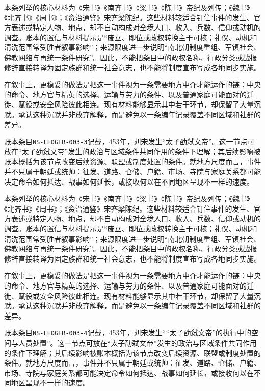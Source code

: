 本条列举的核心材料为《宋书》《南齐书》《梁书》《陈书》帝纪及列传；《魏书》《北齐书》《周书》；《资治通鉴》宋齐梁陈纪。这些材料较适合钉住事件的发生、官方表述或特定人物、地点，却不自动构成对全境人口、收入、兵数、信仰或动机的调查。账本的置信与材料提示是“废立、即位或政权转换主干可核；礼仪、动机和清洗范围常受胜者叙事影响”；来源限度进一步说明“南北朝制度重组、军镇社会、佛教网络与再统一条件研究”。因此，不能把条目中的政权名称、行政分类或战报修辞直接转译为固定族群和统一社会意志，也不能将制度宣布写成各地同步实施。

在叙事上，更稳妥的做法是把这一事件视为一条需要地方中介才能运作的链：中央的命令、地方官与精英的选择、运输与劳力的条件、以及普通家庭可能面对的迁徙、赋役或安全风险彼此相连。现有材料能够显示其中若干环节，却保留了大量沉默。承认这种沉默并非放弃解释，而是避免以一条编年记录覆盖不同区域和社群的差异。

账本条目\texttt{NS-LEDGER-003-3}记载，453年，刘宋发生“太子劭弑文帝”。这一节点可放在“太子劭弑文帝”发生的政治与区域条件共同作用的条件下理解；其后续影响被账本概括为该节点改变后续资源、联盟或制度处置的条件。就地方尺度而言，事件并不只属于朝廷或统帅：征发、道路、仓储、户籍、市场、寺院与家庭关系都可能决定命令如何抵达、战事如何延长，或接收何以在不同地区呈现不一样的速度。

本条列举的核心材料为《宋书》《南齐书》《梁书》《陈书》帝纪及列传；《魏书》《北齐书》《周书》；《资治通鉴》宋齐梁陈纪。这些材料较适合钉住事件的发生、官方表述或特定人物、地点，却不自动构成对全境人口、收入、兵数、信仰或动机的调查。账本的置信与材料提示是“废立、即位或政权转换主干可核；礼仪、动机和清洗范围常受胜者叙事影响”；来源限度进一步说明“南北朝制度重组、军镇社会、佛教网络与再统一条件研究”。因此，不能把条目中的政权名称、行政分类或战报修辞直接转译为固定族群和统一社会意志，也不能将制度宣布写成各地同步实施。

在叙事上，更稳妥的做法是把这一事件视为一条需要地方中介才能运作的链：中央的命令、地方官与精英的选择、运输与劳力的条件、以及普通家庭可能面对的迁徙、赋役或安全风险彼此相连。现有材料能够显示其中若干环节，却保留了大量沉默。承认这种沉默并非放弃解释，而是避免以一条编年记录覆盖不同区域和社群的差异。

账本条目\texttt{NS-LEDGER-003-4}记载，453年，刘宋发生““太子劭弑文帝”的执行中的空间与人员处置”。这一节点可放在“太子劭弑文帝”发生的政治与区域条件共同作用的条件下理解；其后续影响被账本概括为该节点改变后续资源、联盟或制度处置的条件。就地方尺度而言，事件并不只属于朝廷或统帅：征发、道路、仓储、户籍、市场、寺院与家庭关系都可能决定命令如何抵达、战事如何延长，或接收何以在不同地区呈现不一样的速度。

